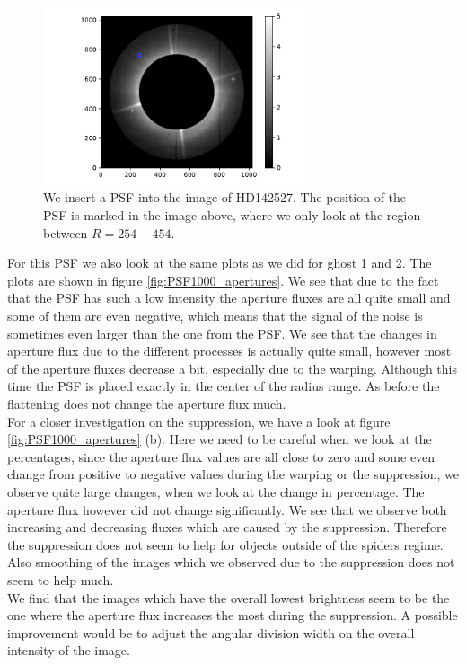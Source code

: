 \begin{figure}[H]
	\centering
		\includegraphics[width=0.7\textwidth]{pics/HDimg_PSF.pdf}
		\caption{We insert a PSF into the image of HD142527. The position of the PSF is marked in the image above, where we only look at the region between $R=254-454$.}
		\label{fig:HDimg_PSF}
\end{figure}
For this PSF we also look at the same plots as we did for ghost 1 and 2. The plots are shown in figure \ref{fig:PSF1000_apertures}. We see that due to the fact that the PSF has such a low intensity the aperture fluxes are all quite small and some of them are even negative, which means that the signal of the noise is sometimes even larger than the one from the PSF. We see that the changes in aperture flux due to the different processes is actually quite small, however most of the aperture fluxes decrease a bit, especially due to the warping. Although this time the PSF is placed exactly in the center of the radius range. As before the flattening does not change the aperture flux much.\\
For a closer investigation on the suppression, we have a look at figure \ref{fig:PSF1000_apertures} (b). Here we need to be careful when we look at the percentages, since the aperture flux values are all close to zero and some even change from positive to negative values during the warping or the suppression, we observe quite large changes, when we look at the change in percentage. The aperture flux however did not change significantly. We see that we observe both increasing and decreasing fluxes which are caused by the suppression. Therefore the suppression does not seem to help for objects outside of the spiders regime. Also smoothing of the images which we observed due to the suppression does not seem to help much. \\
We find that the images which have the overall lowest brightness seem to be the one where the aperture flux increases the most during the suppression. A possible improvement would be to adjust the angular division width on the overall intensity of the image. \\
